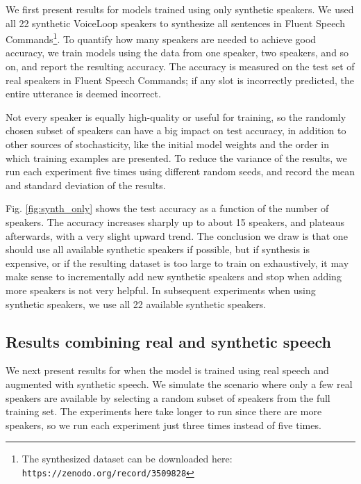 \documentclass{article}
\begin{document}
We first present results for models trained using only synthetic speakers. We used all 22 synthetic VoiceLoop speakers to synthesize all sentences in Fluent Speech Commands\footnote{The synthesized dataset can be downloaded here: \texttt{https://zenodo.org/record/3509828}}. To quantify how many speakers are needed to achieve good accuracy, we train models using the data from one speaker, two speakers, and so on, and report the resulting accuracy. The accuracy is measured on the test set of real speakers in Fluent Speech Commands; if any slot is incorrectly predicted, the entire utterance is deemed incorrect. 

Not every speaker is equally high-quality or useful for training, so the randomly chosen subset of speakers can have a big impact on test accuracy, in addition to other sources of stochasticity, like the initial model weights and the order in which training examples are presented. To reduce the variance of the results, we run each experiment five times using different random seeds, and record the mean and standard deviation of the results.

Fig. \ref{fig:synth_only} shows the test accuracy as a function of the number of speakers. The accuracy increases sharply up to about 15 speakers, and plateaus afterwards, with a very slight upward trend. The conclusion we draw is that one should use all available synthetic speakers if possible, but if synthesis is expensive, or if the resulting dataset is too large to train on exhaustively, it may make sense to incrementally add new synthetic speakers and stop when adding more speakers is not very helpful. In subsequent experiments when using synthetic speakers, we use all 22 available synthetic speakers.

\subsection{Results combining real and synthetic speech}\label{ssec:augment}
We next present results for when the model is trained using real speech and augmented with synthetic speech. We simulate the scenario where only a few real speakers are available by selecting a random subset of speakers from the full training set. The experiments here take longer to run since there are more speakers, so we run each experiment just three times instead of five times. 
\end{document}
